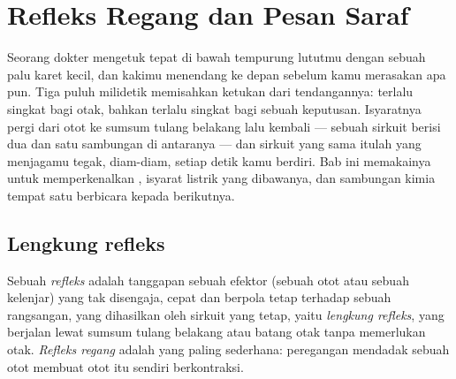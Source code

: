 \chapter{Refleks Regang dan Pesan Saraf}\label{ch:g12:stretch-reflex}

Seorang dokter mengetuk  tepat di bawah tempurung lututmu dengan
sebuah palu karet kecil, dan kakimu menendang ke depan sebelum kamu
merasakan apa pun. Tiga puluh milidetik memisahkan ketukan dari
tendangannya: terlalu singkat bagi otak, bahkan terlalu singkat bagi
sebuah keputusan. Isyaratnya pergi dari otot ke sumsum tulang belakang
lalu kembali --- sebuah sirkuit berisi dua  dan satu sambungan di
antaranya --- dan sirkuit yang sama itulah yang menjagamu tegak,
diam-diam, setiap detik kamu berdiri. Bab ini memakainya untuk
memperkenalkan , isyarat listrik yang dibawanya, dan sambungan
kimia tempat satu  berbicara kepada  berikutnya.

\section{Lengkung refleks}

\begin{definition}[Refleks]\label{def:g12:stretch-reflex:reflex}
Sebuah \emph{refleks} adalah tanggapan sebuah efektor
(sebuah otot atau sebuah kelenjar) yang tak disengaja, cepat dan
berpola tetap terhadap sebuah rangsangan, yang dihasilkan oleh sirkuit
 yang tetap, yaitu \emph{lengkung refleks}, yang berjalan lewat sumsum tulang belakang atau batang otak
tanpa memerlukan otak. \emph{Refleks regang}
adalah yang paling sederhana: peregangan mendadak sebuah otot membuat
otot itu sendiri berkontraksi.
\end{definition}


